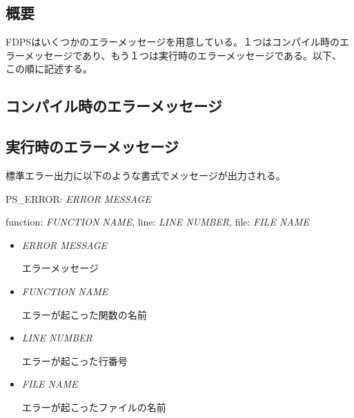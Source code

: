 \subsection{概要}

FDPSはいくつかのエラーメッセージを用意している。１つはコンパイル時のエ
ラーメッセージであり、もう１つは実行時のエラーメッセージである。以下、
この順に記述する。

\subsection{コンパイル時のエラーメッセージ}

\subsection{実行時のエラーメッセージ}

標準エラー出力に以下のような書式でメッセージが出力される。
\begin{screen}
  PS\_ERROR: \textit{ERROR MESSAGE}
  
  function: \textit{FUNCTION NAME}, line: \textit{LINE NUMBER}, file:
  \textit{FILE NAME}
\end{screen}

\begin{itemize}
\item \textit{ERROR MESSAGE}

  エラーメッセージ

\item \textit{FUNCTION NAME}

  エラーが起こった関数の名前

\item \textit{LINE NUMBER}

  エラーが起こった行番号
  
\item \textit{FILE NAME}

  エラーが起こったファイルの名前
    
\end{itemize}








